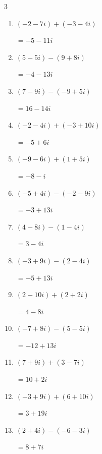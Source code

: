 \begin{multicols}{3}
\begin{enumerate}
        $\displaystyle =-1+12i$

  \item $\displaystyle (-2-7i) + (-3-4i)$

        $\displaystyle =-5-11i$

  \item $\displaystyle (5-5i) - (9+8i)$

        $\displaystyle =-4-13i$

\columnbreak %

  \item $\displaystyle (7-9i) - (-9+5i)$

        $\displaystyle =16-14i$

  \item $\displaystyle (-2-4i) + (-3+10i)$

        $\displaystyle =-5+6i$

  \item $\displaystyle (-9-6i) + (1+5i)$

        $\displaystyle =-8-i$

  \item $\displaystyle (-5+4i) - (-2-9i)$

        $\displaystyle =-3+13i$

  \item $\displaystyle (4-8i) - (1-4i)$

        $\displaystyle =3-4i$

  \item $\displaystyle (-3+9i) - (2-4i)$

        $\displaystyle =-5+13i$

  \item $\displaystyle (2-10i) + (2+2i)$

        $\displaystyle =4-8i$

  \item $\displaystyle (-7+8i) - (5-5i)$

        $\displaystyle =-12+13i$

  \item $\displaystyle (7+9i) + (3-7i)$

        $\displaystyle =10+2i$

  \item $\displaystyle (-3+9i) + (6+10i)$

        $\displaystyle =3+19i$

  \item $\displaystyle (2+4i) - (-6-3i)$

        $\displaystyle =8+7i$


\end{enumerate}
\end{multicols}
